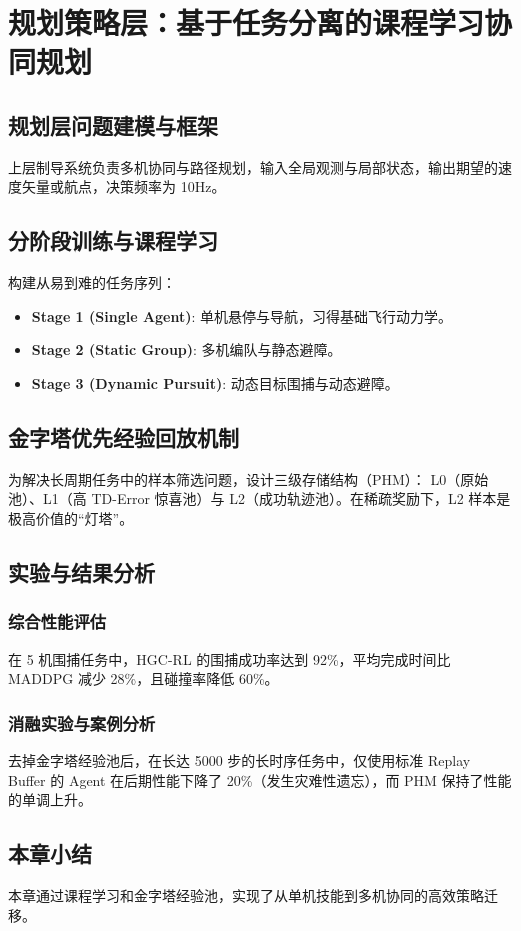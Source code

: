 \chapter{规划策略层：基于任务分离的课程学习协同规划}

\section{规划层问题建模与框架}
上层制导系统负责多机协同与路径规划，输入全局观测与局部状态，输出期望的速度矢量或航点，决策频率为 10Hz。

\section{分阶段训练与课程学习}
构建从易到难的任务序列：
\begin{itemize}
    \item \textbf{Stage 1 (Single Agent)}: 单机悬停与导航，习得基础飞行动力学。
    \item \textbf{Stage 2 (Static Group)}: 多机编队与静态避障。
    \item \textbf{Stage 3 (Dynamic Pursuit)}: 动态目标围捕与动态避障。
\end{itemize}

\section{金字塔优先经验回放机制}
为解决长周期任务中的样本筛选问题，设计三级存储结构（PHM）：
L0（原始池）、L1（高 TD-Error 惊喜池）与 L2（成功轨迹池）。在稀疏奖励下，L2 样本是极高价值的“灯塔”。

\section{实验与结果分析}
\subsection{综合性能评估}
在 5 机围捕任务中，HGC-RL 的围捕成功率达到 92\%，平均完成时间比 MADDPG 减少 28\%，且碰撞率降低 60\%。
\subsection{消融实验与案例分析}
去掉金字塔经验池后，在长达 5000 步的长时序任务中，仅使用标准 Replay Buffer 的 Agent 在后期性能下降了 20\%（发生灾难性遗忘），而 PHM 保持了性能的单调上升。

\section{本章小结}
本章通过课程学习和金字塔经验池，实现了从单机技能到多机协同的高效策略迁移。
